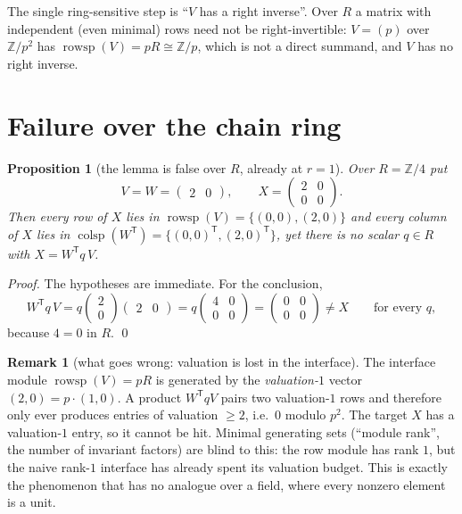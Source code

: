 \documentclass[11pt,a4paper]{article}
\theoremstyle{plain}
\newtheorem{proposition}[lemma]{Proposition}
\theoremstyle{definition}
\newtheorem{remark}[lemma]{Remark}
\newcommand{\Zp}{\mathbb{Z}}
\newcommand{\R}{R}
\newcommand{\rowsp}{\operatorname{rowsp}}
\newcommand{\colsp}{\operatorname{colsp}}
\newcommand{\T}{^{\mathsf T}}
\begin{document}
The single ring-sensitive step is ``$V$ has a right inverse''. Over $\R$ a
matrix with independent (even minimal) rows need not be right-invertible:
$V=(p)$ over $\Zp/p^{2}$ has $\rowsp(V)=p\R\cong\Zp/p$, which is not a
direct summand, and $V$ has no right inverse.

\section{Failure over the chain ring}

\begin{proposition}[the lemma is false over $\R$, already at $r=1$]
\label{prop:fail}
Over $\R=\Zp/4$ put
\[
  V=W=\begin{pmatrix}2&0\end{pmatrix},\qquad
  X=\begin{pmatrix}2&0\\0&0\end{pmatrix}.
\]
Then every row of $X$ lies in $\rowsp(V)=\{(0,0),(2,0)\}$ and every column
of $X$ lies in $\colsp(W\T)=\{(0,0)\T,(2,0)\T\}$, yet there is no scalar
$q\in\R$ with $X=W\T q\,V$.
\end{proposition}

\begin{proof}
The hypotheses are immediate. For the conclusion,
\[
  W\T q\,V
  = q\begin{pmatrix}2\\0\end{pmatrix}\begin{pmatrix}2&0\end{pmatrix}
  = q\begin{pmatrix}4&0\\0&0\end{pmatrix}
  = \begin{pmatrix}0&0\\0&0\end{pmatrix}\neq X
  \qquad\text{for every }q,
\]
because $4=0$ in $\R$. \qed
\end{proof}

\begin{remark}[what goes wrong: valuation is lost in the interface]
The interface module $\rowsp(V)=p\R$ is generated by the
\emph{valuation-$1$} vector $(2,0)=p\cdot(1,0)$. A product $W\T q V$ pairs
two valuation-$1$ rows and therefore only ever produces entries of
valuation $\ge 2$, i.e.\ $0$ modulo $p^{2}$. The target $X$ has a
valuation-$1$ entry, so it cannot be hit. Minimal generating sets
(``module rank'', the number of invariant factors) are blind to this: the
row module has rank $1$, but the naive rank-$1$ interface has already
spent its valuation budget. This is exactly the phenomenon that has no
analogue over a field, where every nonzero element is a unit.
\end{remark}
\end{document}
